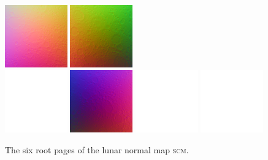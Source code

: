 \documentclass[oneside,10pt]{memoir}
\newcommand{\scm}     {\textsc{scm}}
\begin{document}
\begin{Spacing}{1.1}
\begin{figure}
  \includegraphics[width=0.24\textwidth]{fig/dtmn0.png}
  \includegraphics[width=0.24\textwidth]{fig/dtmn5.png}\\\vspace{1pt}
  \includegraphics[width=0.24\textwidth]{fig/blank.pdf}
  \includegraphics[width=0.24\textwidth]{fig/dtmn3.png}
  \includegraphics[width=0.24\textwidth]{fig/blank.pdf}
  \includegraphics[width=0.24\textwidth]{fig/blank.pdf}
  \caption{The six root pages of the lunar normal map \scm.}
  \label{fig:dtmn}
\end{figure}



\end{Spacing}
\end{document}
